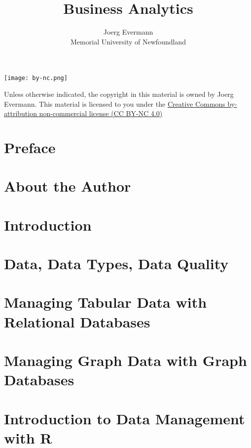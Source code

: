 \documentclass{book}
\title{Business Analytics}
\author{Joerg Evermann\\
Memorial University of Newfoundland}
\begin{document}
\frontmatter 

\maketitle

\vfill
\begin{center}
\texttt{[image: by-nc.png]}

Unless otherwise indicated, the copyright in this material is owned by Joerg Evermann. This material is licensed to you under the \href{https://creativecommons.org/licenses/by-nc/4.0/}{Creative Commons by-attribution non-commercial license (CC BY-NC 4.0)}
\end{center}

\tableofcontents
\listoffigures
\listoftables

\chapter{Preface}

\chapter{About the Author}


\mainmatter

\graphicspath{{class01/}}
\chapter{Introduction}


\graphicspath{{class02/}}
\chapter{Data, Data Types, Data Quality}


\graphicspath{{class03/}}
\chapter{Managing Tabular Data with Relational Databases}


\graphicspath{{class04/}}
\chapter{Managing Graph Data with Graph Databases}


\graphicspath{{class05/}}
\chapter{Introduction to Data Management with R}

\end{document}
